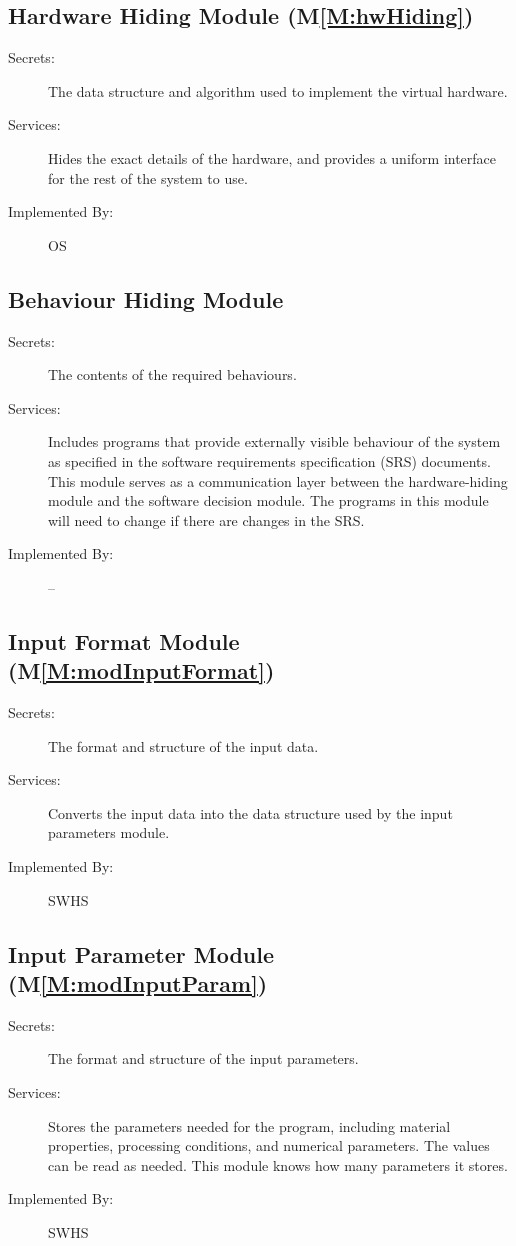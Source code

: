 \documentclass[12pt]{article}
\begin{document}
\subsection{Hardware Hiding Module (M\ref{M:hwHiding})}
\label{Sec:HardHidiModu()}
\begin{description}
\item[Secrets:]The data structure and algorithm used to implement the virtual hardware.
\item[Services:]Hides the exact details of the hardware, and provides a uniform interface for the rest of the system to use.
\item[Implemented By:]OS
\end{description}
\subsection{Behaviour Hiding Module}
\label{Sec:BehaHidiModu}
\begin{description}
\item[Secrets:]The contents of the required behaviours.
\item[Services:]Includes programs that provide externally visible behaviour of the system as specified in the software requirements specification (SRS) documents. This module serves as a communication layer between the hardware-hiding module and the software decision module. The programs in this module will need to change if there are changes in the SRS.
\item[Implemented By:]--
\end{description}
\subsection{Input Format Module (M\ref{M:modInputFormat})}
\label{Sec:InpuFormModu()}
\begin{description}
\item[Secrets:]The format and structure of the input data.
\item[Services:]Converts the input data into the data structure used by the input parameters module.
\item[Implemented By:]SWHS
\end{description}
\subsection{Input Parameter Module (M\ref{M:modInputParam})}
\label{Sec:InpuParaModu()}
\begin{description}
\item[Secrets:]The format and structure of the input parameters.
\item[Services:]Stores the parameters needed for the program, including material properties, processing conditions, and numerical parameters. The values can be read as needed. This module knows how many parameters it stores.
\item[Implemented By:]SWHS
\end{description}
\end{document}
